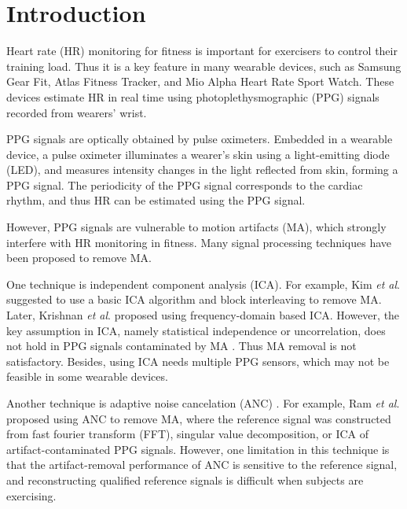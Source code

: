 \documentclass[10pt,twocolumn]{IEEEtran}
\begin{document}
\IEEEpeerreviewmaketitle


\section{Introduction}


Heart rate (HR) monitoring for fitness is important for exercisers to control their training load. Thus it is a key feature in many wearable devices, such as Samsung Gear Fit, Atlas Fitness Tracker, and Mio Alpha Heart Rate Sport Watch. These devices estimate HR in real time using photoplethysmographic (PPG) signals recorded from wearers' wrist.


PPG signals \cite{allen2007PPG,kamal1989skin} are optically obtained by pulse oximeters. Embedded in a wearable device, a pulse oximeter illuminates a wearer's skin using a  light-emitting diode (LED), and measures intensity changes in the light reflected from skin, forming a PPG signal. The periodicity of the PPG signal corresponds to the cardiac rhythm, and thus HR can be estimated using the PPG signal.



However, PPG signals are vulnerable to motion artifacts (MA), which strongly interfere with HR monitoring in fitness. Many signal processing techniques have been proposed to remove MA.

One technique is independent component analysis (ICA). For example, Kim \emph{et al}. \cite{kim2006ICA} suggested to use a basic ICA algorithm and block interleaving to remove MA.  Later, Krishnan \emph{et al}. \cite{krishnan2010TwoStageICA} proposed using frequency-domain based ICA. However, the key assumption in ICA, namely statistical independence or uncorrelation, does not hold in PPG signals contaminated by MA \cite{yao2005ICAstudy}. Thus MA removal is not satisfactory. Besides, using ICA needs multiple PPG sensors, which may not be feasible in some wearable devices.

Another technique is adaptive noise cancelation (ANC) \cite{ram2012AS_LMS,yousefi2013ANC}. For example, Ram \emph{et al}. \cite{ram2012AS_LMS} proposed using ANC to remove MA, where the reference signal was constructed from fast fourier transform (FFT), singular value decomposition, or ICA of artifact-contaminated PPG signals. However, one limitation in this technique is that the artifact-removal performance of ANC is sensitive to the reference signal, and reconstructing qualified reference signals is difficult when subjects are exercising.
\end{document}
